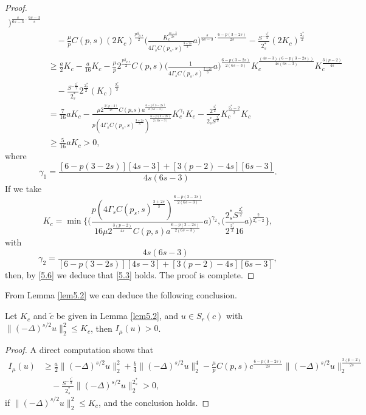 \documentclass[reqno]{amsart}
\begin{document}
\begin{proof}
\begin{equation}
\begin{split}
   \Big)^{{\frac{s}{6s-3}}\cdot\frac{6s-3}{s}}\\
&\quad -\frac{\mu}{p}C(p,s)(2K_c)^{\frac{p {\delta_{p,s}}}{2}} 
 \Big(\frac{K_c^{\frac{4s-3}{2s}}}{4\Gamma_s C(p_s, s)^{\frac{3+2s}{3}}}a
 \Big)^{\frac{s}{6s-3}\cdot{\frac{6-p(3-2s)}{2s}}}
 -\frac{S^{-\frac{2^*_s}{2}}}{2^*_s}(2K_c)^{\frac{2^*_s}{2}}\\
&\geq  \frac{a}{2}K_c-\frac{a}{16}K_c-\frac{\mu}{p}2^{\frac{p {\delta_{p,s}}}{2}}
 C(p,s)\Big(\frac{1}{4\Gamma_s C(p_s, s)^{\frac{3+2s}{3}}}a
 \Big)^{{\frac{6-p(3-2s)}{2(6s-3)}}}K^{\frac{(4s-3)(6-p(3-2s))}{4s(6s-3)}}_c 
  K^{\frac{3(p-2)}{4s}}_c\\
&\quad -\frac{S^{-\frac{2^*_s}{2}}}{2^*_s}2^{\frac{2^*_s}{2}}(K_c)^{\frac{2^*_s}{2}}\\
&= \frac{7}{16}aK_c-\frac{\mu 2^{\frac{3(p-2)}{4s}}C(p,s)a^{{\frac{6-p(3-2s)}{2(6s-3)}}}}{p(4\Gamma_s C(p_s, s)^{\frac{3+2s}{3}})^{\frac{6-p(3-2s)}{2(6s-3)}}}K^{\gamma_1}_c K_c-\frac{2^{\frac{2^*_s}{2}}}{2^*_sS^{\frac{2^*_s}{2}}}K^{\frac{2^*_s-2}{2}}_c K_c\\
&\geq   \frac{5}{16}aK_c>0,
\end{split}
\end{equation}
where 
\[
\gamma_1=\frac{[6-p(3-2s)][4s-3]+[3(p-2)-4s][6s-3]}{4s(6s-3)}.
\] 
If we take
$$
K_c=\min\Big\{ \Big(\frac{{p(4\Gamma_s C(p_s, s)^{\frac{3+2s}{3}}) }
 ^{\frac{6-p(3-2s)}{2(6s-3)}}}{16 \mu 2^{\frac{3(p-2)}{4s}}C(p,s)
 a^\frac{6-p(3-2s)}{2(6s-3)}} a\Big)^{\gamma_2}, 
 \Big(\frac{2^*_s S^{\frac{2^*_s}{2}}}{2^{\frac{2^*_s}{2}}16} a
  \Big)^{\frac{2}{2^*_s-2}}\Big\},
$$
with 
\[
\gamma_2=\frac{4s(6s-3)}{[6-p(3-2s)][4s-3]+[3(p-2)-4s][6s-3]},
\]
then, by \eqref{5.6} we deduce that \eqref{5.3} holds. The proof is complete.
\end{proof}

From Lemma \ref{lem5.2}  we can deduce the following conclusion.

\begin{corollary}\label{cor5.1}  
Let $K_c$ and $\tilde{c}$ be given in Lemma \ref{lem5.2}, and $u\in  S_{r}(c)$ with 
$\|(-\Delta)^{s/2}u\|^2_2 \leq K_c$, then $I_\mu(u)>0$.
\end{corollary}

\begin{proof}
A direct computation shows that
\begin{align*} %
I_\mu(u)
&\geq  \frac{a}{2}\|(-\Delta)^{s/2}u\|^2_2+\frac{b}{4}\|(-\Delta)^{s/2}u\|^4_2
 -\frac{\mu}{p}C(p,s)
c^{\frac{6-p(3-2s)}{2s}}\|(-\Delta)^{s/2}u\|^{\frac{3(p-2)}{2s}}_2\\
&\quad -\frac{S^{-\frac{2^*_s}{2}}}{2^*_s}\|(-\Delta)^{s/2}u\|^{2^*_s}_2>0,
\end{align*}
if $\|(-\Delta)^{s/2}u\|^2_2 \leq K_c$, and the conclusion holds.
\end{proof}
\end{document}
